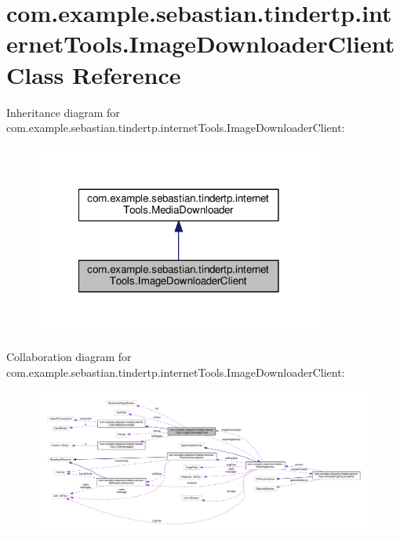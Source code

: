 \hypertarget{classcom_1_1example_1_1sebastian_1_1tindertp_1_1internetTools_1_1ImageDownloaderClient}{}\section{com.\+example.\+sebastian.\+tindertp.\+internet\+Tools.\+Image\+Downloader\+Client Class Reference}
\label{classcom_1_1example_1_1sebastian_1_1tindertp_1_1internetTools_1_1ImageDownloaderClient}


Inheritance diagram for com.\+example.\+sebastian.\+tindertp.\+internet\+Tools.\+Image\+Downloader\+Client\+:\nopagebreak
\begin{figure}[H]
\begin{center}
\leavevmode
\includegraphics[width=270pt]{classcom_1_1example_1_1sebastian_1_1tindertp_1_1internetTools_1_1ImageDownloaderClient__inherit__graph}
\end{center}
\end{figure}


Collaboration diagram for com.\+example.\+sebastian.\+tindertp.\+internet\+Tools.\+Image\+Downloader\+Client\+:
\nopagebreak
\begin{figure}[H]
\begin{center}
\leavevmode
\includegraphics[width=350pt]{classcom_1_1example_1_1sebastian_1_1tindertp_1_1internetTools_1_1ImageDownloaderClient__coll__graph}
\end{center}
\end{figure}
